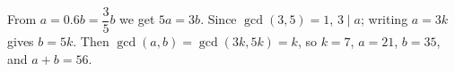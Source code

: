 From $a=0.6b=\dfrac35b$ we get $5a=3b$. Since $\gcd(3,5)=1$, $3\mid a$; writing $a=3k$ gives $b=5k$. Then $\gcd(a,b)=\gcd(3k,5k)=k$, so $k=7$, $a=21$, $b=35$, and $a+b=\boxed{56}$.
